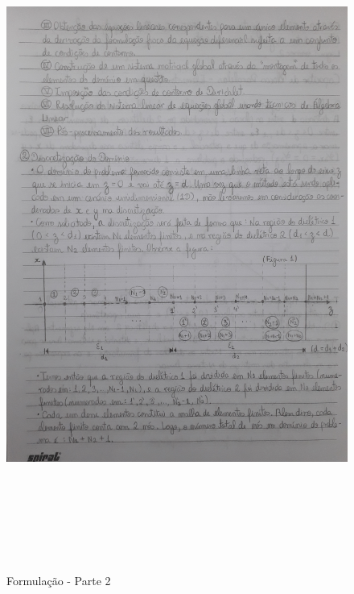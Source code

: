 \documentclass[10pt]{article}
\begin{document}
    \begin{figure}[!htb]
    \centerline{\includegraphics[width=20cm,height=22cm]{Formulação Matemática/Formulacao - Parte 2.jpg}}
    \caption{Formulação - Parte 2}
    \label{fig:fp2}
    \end{figure}
    
\end{document}
